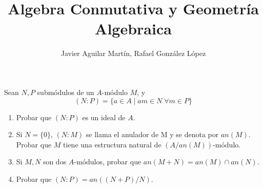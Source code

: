 \documentclass[twoside]{article}
\begin{document}
\title{Algebra Conmutativa y Geometría Algebraica}
\author{Javier Aguilar Martín, Rafael González López}
\maketitle

\begin{ejercicio}{2}
Sean $N,P$ submódulos de un $A$-módulo $M$, y $$(N:P) = \{a\in A\mid am\in N \;\forall m \in P\}$$
\begin{enumerate}
\item Probar que $(N:P)$ es un ideal de $A$.
\item Si $N=\{0\}$, $(N:M)$ se llama el anulador de M y se denota por $an(M)$. Probar que $M$ tiene una estructura natural de $(A/an(M))$-módulo.
\item Si $M,N$ son dos $A$-módulos, probar que $an(M+N)=an(M)\cap an(N)$.
\item Probar que $(N:P)=an((N+P)/N)$.
\end{enumerate}
\end{ejercicio}
\end{document}
